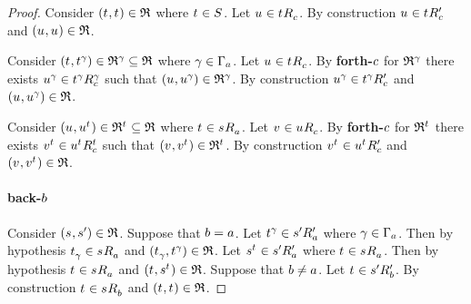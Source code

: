 \begin{proof}
Consider $(\kStateT, \kStateT) \in \refinement$ where $\kStateT \in \kStates$.
Let $\kStateU \in \kSuccessorsC{\kStateT}$.
By construction $\kStateU \in \kSuccessorsPC{\kStateT}$ and $(\kStateU, \kStateU) \in \refinement$.

Consider $(\kStateT, \kStateT[\gamma]) \in \refinement^\gamma \subseteq \refinement$ where $\gamma \in \Gamma_\agentA$.
Let $\kStateU \in \kSuccessorsC{\kStateT}$.
By {\bf forth-$\agentC$} for $\refinement^\gamma$ there exists $\kStateU[\gamma] \in \kSuccessorsC[\gamma]{\kStateT[\gamma]}$ such that $(\kStateU, \kStateU[\gamma]) \in \refinement^\gamma$.
By construction $\kStateU[\gamma] \in \kSuccessorsPC{\kStateT[\gamma]}$ and $(\kStateU, \kStateU[\gamma]) \in \refinement$.

Consider $(\kStateU, \kStateU[\kStateT]) \in \refinement^{\kStateT} \subseteq \refinement$ where $\kStateT \in \kSuccessorsA{\kStateS}$.
Let $\kStateV \in \kSuccessorsC{\kStateU}$.
By {\bf forth-$\agentC$} for $\refinement^{\kStateT}$ there exists $\kStateV[\kStateT] \in \kSuccessorsC[\kStateT]{\kStateU[\kStateT]}$ such that $(\kStateV, \kStateV[\kStateT]) \in \refinement^{\kStateT}$.
By construction $\kStateV[\kStateT] \in \kSuccessorsPC{\kStateU[\kStateT]}$ and $(\kStateV, \kStateV[\kStateT]) \in \refinement$.

\paragraph{back-$\agentB$}

Consider $(\kStateS, \kStateSP) \in \refinement$.
Suppose that $\agentB = \agentA$.
Let $\kStateT[\gamma] \in \kSuccessorsPA{\kStateSP}$ where $\gamma \in \Gamma_\agentA$.
Then by hypothesis $\kStateT_\gamma \in \kSuccessorsA{\kStateS}$ and $(\kStateT_\gamma, \kStateT[\gamma]) \in \refinement$.
Let $\kStateS[\kStateT] \in \kSuccessorsPA{\kStateSP}$ where $\kStateT \in \kSuccessorsA{\kStateS}$.
Then by hypothesis $\kStateT \in \kSuccessorsA{\kStateS}$ and $(\kStateT, \kStateS[\kStateT]) \in \refinement$.
Suppose that $\agentB \neq \agentA$.
Let $\kStateT \in \kSuccessorsPB{\kStateSP}$.
By construction $\kStateT \in \kSuccessorsB{\kStateS}$ and $(\kStateT, \kStateT) \in \refinement$.


\end{proof}
